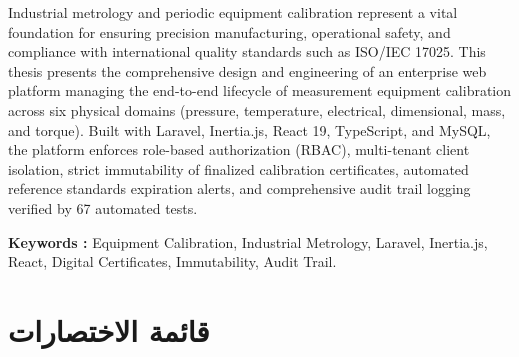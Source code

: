 \documentclass{bts-report-ar}
\begin{document}
\begin{abstracten}
Industrial metrology and periodic equipment calibration represent a vital foundation for ensuring precision manufacturing, operational safety, and compliance with international quality standards such as ISO/IEC 17025. This thesis presents the comprehensive design and engineering of an enterprise web platform managing the end-to-end lifecycle of measurement equipment calibration across six physical domains (pressure, temperature, electrical, dimensional, mass, and torque). Built with Laravel, Inertia.js, React 19, TypeScript, and MySQL, the platform enforces role-based authorization (RBAC), multi-tenant client isolation, strict immutability of finalized calibration certificates, automated reference standards expiration alerts, and comprehensive audit trail logging verified by 67 automated tests.

\vspace{0.6cm}
\noindent\textbf{Keywords :} Equipment Calibration, Industrial Metrology, Laravel, Inertia.js, React, Digital Certificates, Immutability, Audit Trail.
\end{abstracten}

\tableofcontents
\listoffigures
\listoftables

\chapter*{قائمة الاختصارات}

\begin{abbrevtablear}
\end{abbrevtablear}
\end{document}
